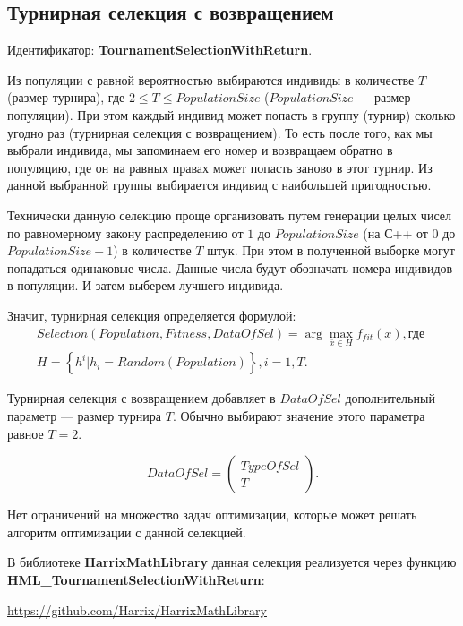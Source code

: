 \subsection{Турнирная селекция с возвращением}\label{SetOfOperatorsAlgorithms:TournamentSelectionWithReturn}

Идентификатор: \textbf{TournamentSelectionWithReturn}.

Из популяции с равной вероятностью выбираются индивиды в количестве $ T $ (размер турнира), где $ 2\leq T\leq PopulationSize $ ($ PopulationSize $ --- размер популяции). При этом каждый индивид может попасть в группу (турнир) сколько угодно раз (турнирная селекция с возвращением). То есть после того, как мы выбрали индивида, мы запоминаем его номер и возвращаем обратно в популяцию, где он на равных правах может попасть заново в этот турнир. Из данной выбранной группы выбирается индивид с наибольшей пригодностью.

Технически данную селекцию проще организовать путем генерации целых чисел по равномерному закону распределению от $ 1 $ до $ PopulationSize $ (на С++ от $ 0 $ до $ PopulationSize-1 $) в количестве $ T $ штук. При этом в полученной выборке могут попадаться одинаковые числа. Данные числа будут обозначать номера индивидов в популяции. И затем выберем лучшего индивида.

Значит, турнирная селекция определяется формулой:
\begin{align}
\label{SetOfOperatorsAlgorithms:eq:TournamentSelectionWithReturn}
Selection\left( Population, Fitness, DataOfSel\right) = \arg{\max_{\bar{x}\in H} {f_{fit}\left( \bar{x}\right) }}, \text{где }\\
H=\left\lbrace h^i | h_i=Random \left( Population \right) \right\rbrace, i=\overline{1,T}\nonumber.
\end{align}

Турнирная селекция с возвращением добавляет в $ DataOfSel $ дополнительный параметр --- размер турнира $ T $. Обычно выбирают значение этого параметра равное $ T=2 $.

\begin{equation}
DataOfSel=\left( \begin{array}{c} TypeOfSel \\ T \end{array} \right).
\end{equation}

Нет ограничений на множество задач оптимизации, которые может решать алгоритм оптимизации с данной селекцией.

В библиотеке \textbf{HarrixMathLibrary} данная селекция реализуется через функцию \textbf{HML\_TournamentSelectionWithReturn}:

\href{https://github.com/Harrix/HarrixMathLibrary}{https://github.com/Harrix/HarrixMathLibrary}